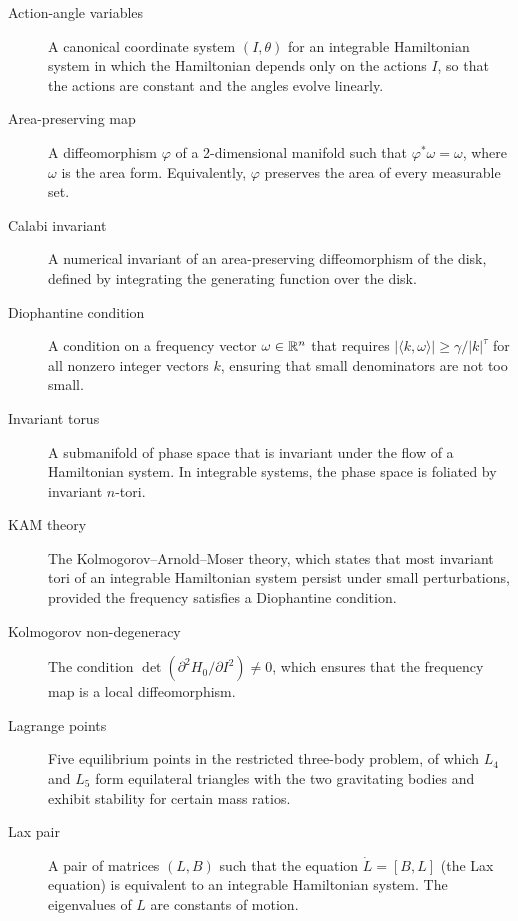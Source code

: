 \begin{description}
\item[Action-angle variables] A canonical coordinate system $(I,\theta)$ for an integrable Hamiltonian system in which the Hamiltonian depends only on the actions $I$, so that the actions are constant and the angles evolve linearly.

\item[Area-preserving map] A diffeomorphism $\varphi$ of a 2-dimensional manifold such that $\varphi^*\omega = \omega$, where $\omega$ is the area form. Equivalently, $\varphi$ preserves the area of every measurable set.

\item[Calabi invariant] A numerical invariant of an area-preserving diffeomorphism of the disk, defined by integrating the generating function over the disk.

\item[Diophantine condition] A condition on a frequency vector $\omega \in \mathbb{R}^n$ that requires $|\langle k, \omega \rangle| \geq \gamma/|k|^\tau$ for all nonzero integer vectors $k$, ensuring that small denominators are not too small.

\item[Invariant torus] A submanifold of phase space that is invariant under the flow of a Hamiltonian system. In integrable systems, the phase space is foliated by invariant $n$-tori.

\item[KAM theory] The Kolmogorov--Arnold--Moser theory, which states that most invariant tori of an integrable Hamiltonian system persist under small perturbations, provided the frequency satisfies a Diophantine condition.

\item[Kolmogorov non-degeneracy] The condition $\det(\partial^2 H_0/\partial I^2) \neq 0$, which ensures that the frequency map is a local diffeomorphism.

\item[Lagrange points] Five equilibrium points in the restricted three-body problem, of which $L_4$ and $L_5$ form equilateral triangles with the two gravitating bodies and exhibit stability for certain mass ratios.

\item[Lax pair] A pair of matrices $(L,B)$ such that the equation $\dot{L} = [B, L]$ (the Lax equation) is equivalent to an integrable Hamiltonian system. The eigenvalues of $L$ are constants of motion.


\end{description}
